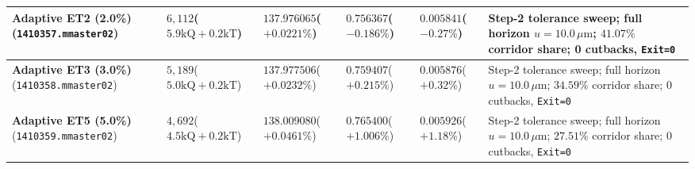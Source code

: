 \documentclass[10pt,a4paper]{article}
\begin{document}
\begin{table}[h!]
\begin{tabularx}{\textwidth}{L{34mm} C{15mm} C{19mm} C{18mm} C{17mm} X}
    \midrule
    \textbf{Adaptive ET2 (2.0\%)}\newline(\texttt{1410357.mmaster02}) & $6{,}112$\newline($5.9\mathrm{kQ}+0.2\mathrm{kT}$) & $\mathbf{137.976065}$\newline($+0.0221\%$) & $\mathbf{0.756367}$\newline($-0.186\%$) & $\mathbf{0.005841}$\newline($-0.27\%$) & Step-2 tolerance sweep; full horizon $u=10.0\,\mu\mathrm{m}$; $41.07\%$ corridor share; 0 cutbacks, \texttt{Exit=0} \\
    \midrule
    \textbf{Adaptive ET3 (3.0\%)}\newline(\texttt{1410358.mmaster02}) & $5{,}189$\newline($5.0\mathrm{kQ}+0.2\mathrm{kT}$) & $\mathbf{137.977506}$\newline($+0.0232\%$) & $\mathbf{0.759407}$\newline($+0.215\%$) & $\mathbf{0.005876}$\newline($+0.32\%$) & Step-2 tolerance sweep; full horizon $u=10.0\,\mu\mathrm{m}$; $34.59\%$ corridor share; 0 cutbacks, \texttt{Exit=0} \\
    \midrule
    \textbf{Adaptive ET5 (5.0\%)}\newline(\texttt{1410359.mmaster02}) & $4{,}692$\newline($4.5\mathrm{kQ}+0.2\mathrm{kT}$) & $\mathbf{138.009080}$\newline($+0.0461\%$) & $\mathbf{0.765400}$\newline($+1.006\%$) & $\mathbf{0.005926}$\newline($+1.18\%$) & Step-2 tolerance sweep; full horizon $u=10.0\,\mu\mathrm{m}$; $27.51\%$ corridor share; 0 cutbacks, \texttt{Exit=0} \\
    \bottomrule
  \end{tabularx}
\end{table}
\end{document}

